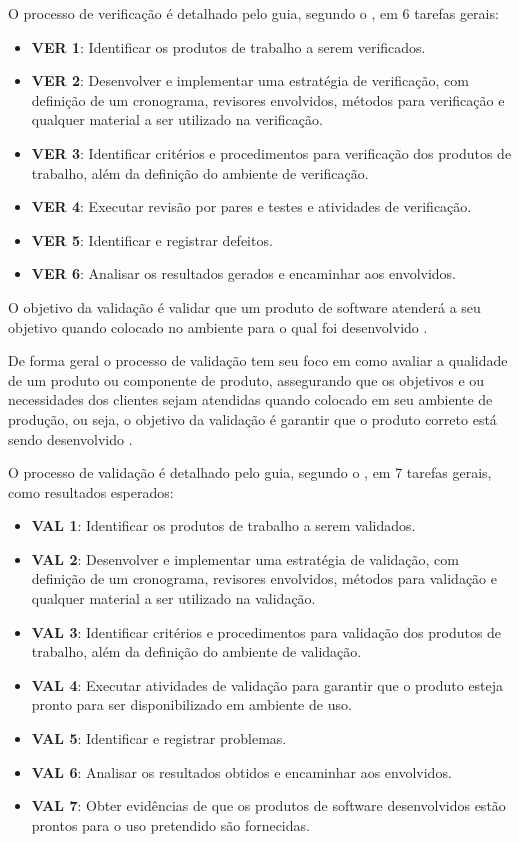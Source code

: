 O processo de verificação é detalhado pelo guia, segundo o \cite{softex}, em 6 tarefas gerais:

\begin{itemize}
  \item \textbf{VER 1}: Identificar os produtos de trabalho a serem verificados.
  \item \textbf{VER 2}: Desenvolver e implementar uma estratégia de verificação, com definição de um cronograma,
    revisores envolvidos, métodos para verificação e qualquer material a ser utilizado na verificação.
  \item \textbf{VER 3}: Identificar critérios e procedimentos para verificação dos produtos de trabalho,
    além da definição do ambiente de verificação.
  \item \textbf{VER 4}: Executar revisão por pares e testes e atividades de verificação.
  \item \textbf{VER 5}: Identificar e registrar defeitos.
  \item \textbf{VER 6}: Analisar os resultados gerados e encaminhar aos envolvidos.
\end{itemize}

O objetivo da validação é validar que um produto de software atenderá a seu objetivo quando colocado no ambiente para o
qual foi desenvolvido \cite{sommerville}.

De forma geral o processo de validação tem seu foco em como avaliar a qualidade de um produto ou componente de produto,
assegurando que os objetivos e ou necessidades dos clientes sejam atendidas quando colocado em seu ambiente de produção,
ou seja, o objetivo da validação é garantir que o produto correto está sendo desenvolvido \cite{softex}.

O processo de validação é detalhado pelo guia, segundo o \cite{softex}, em 7 tarefas gerais, como resultados esperados:

\begin{itemize}
  \item \textbf{VAL 1}: Identificar os produtos de trabalho a serem validados.
  \item \textbf{VAL 2}: Desenvolver e implementar uma estratégia de validação, com definição de um cronograma,
    revisores envolvidos, métodos para validação e qualquer material a ser utilizado na validação.
  \item \textbf{VAL 3}: Identificar critérios e procedimentos para validação dos produtos de trabalho, além da
    definição do ambiente de validação.
  \item \textbf{VAL 4}: Executar atividades de validação para garantir que o produto esteja pronto para ser
    disponibilizado em ambiente de uso.
  \item \textbf{VAL 5}: Identificar e registrar problemas.
  \item \textbf{VAL 6}: Analisar os resultados obtidos e encaminhar aos envolvidos.
  \item \textbf{VAL 7}: Obter evidências de que os produtos de software desenvolvidos estão prontos para o uso
    pretendido são fornecidas.
\end{itemize}

